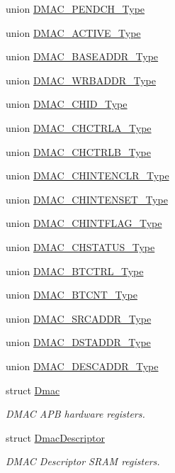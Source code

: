 \begin{DoxyCompactItemize}
union \mbox{\hyperlink{union_d_m_a_c___p_e_n_d_c_h___type}{D\+M\+A\+C\+\_\+\+P\+E\+N\+D\+C\+H\+\_\+\+Type}}
\item 
union \mbox{\hyperlink{union_d_m_a_c___a_c_t_i_v_e___type}{D\+M\+A\+C\+\_\+\+A\+C\+T\+I\+V\+E\+\_\+\+Type}}
\item 
union \mbox{\hyperlink{union_d_m_a_c___b_a_s_e_a_d_d_r___type}{D\+M\+A\+C\+\_\+\+B\+A\+S\+E\+A\+D\+D\+R\+\_\+\+Type}}
\item 
union \mbox{\hyperlink{union_d_m_a_c___w_r_b_a_d_d_r___type}{D\+M\+A\+C\+\_\+\+W\+R\+B\+A\+D\+D\+R\+\_\+\+Type}}
\item 
union \mbox{\hyperlink{union_d_m_a_c___c_h_i_d___type}{D\+M\+A\+C\+\_\+\+C\+H\+I\+D\+\_\+\+Type}}
\item 
union \mbox{\hyperlink{union_d_m_a_c___c_h_c_t_r_l_a___type}{D\+M\+A\+C\+\_\+\+C\+H\+C\+T\+R\+L\+A\+\_\+\+Type}}
\item 
union \mbox{\hyperlink{union_d_m_a_c___c_h_c_t_r_l_b___type}{D\+M\+A\+C\+\_\+\+C\+H\+C\+T\+R\+L\+B\+\_\+\+Type}}
\item 
union \mbox{\hyperlink{union_d_m_a_c___c_h_i_n_t_e_n_c_l_r___type}{D\+M\+A\+C\+\_\+\+C\+H\+I\+N\+T\+E\+N\+C\+L\+R\+\_\+\+Type}}
\item 
union \mbox{\hyperlink{union_d_m_a_c___c_h_i_n_t_e_n_s_e_t___type}{D\+M\+A\+C\+\_\+\+C\+H\+I\+N\+T\+E\+N\+S\+E\+T\+\_\+\+Type}}
\item 
union \mbox{\hyperlink{union_d_m_a_c___c_h_i_n_t_f_l_a_g___type}{D\+M\+A\+C\+\_\+\+C\+H\+I\+N\+T\+F\+L\+A\+G\+\_\+\+Type}}
\item 
union \mbox{\hyperlink{union_d_m_a_c___c_h_s_t_a_t_u_s___type}{D\+M\+A\+C\+\_\+\+C\+H\+S\+T\+A\+T\+U\+S\+\_\+\+Type}}
\item 
union \mbox{\hyperlink{union_d_m_a_c___b_t_c_t_r_l___type}{D\+M\+A\+C\+\_\+\+B\+T\+C\+T\+R\+L\+\_\+\+Type}}
\item 
union \mbox{\hyperlink{union_d_m_a_c___b_t_c_n_t___type}{D\+M\+A\+C\+\_\+\+B\+T\+C\+N\+T\+\_\+\+Type}}
\item 
union \mbox{\hyperlink{union_d_m_a_c___s_r_c_a_d_d_r___type}{D\+M\+A\+C\+\_\+\+S\+R\+C\+A\+D\+D\+R\+\_\+\+Type}}
\item 
union \mbox{\hyperlink{union_d_m_a_c___d_s_t_a_d_d_r___type}{D\+M\+A\+C\+\_\+\+D\+S\+T\+A\+D\+D\+R\+\_\+\+Type}}
\item 
union \mbox{\hyperlink{union_d_m_a_c___d_e_s_c_a_d_d_r___type}{D\+M\+A\+C\+\_\+\+D\+E\+S\+C\+A\+D\+D\+R\+\_\+\+Type}}
\item 
struct \mbox{\hyperlink{struct_dmac}{Dmac}}
\begin{DoxyCompactList}\small\item\em D\+M\+AC A\+PB hardware registers. \end{DoxyCompactList}\item 
struct \mbox{\hyperlink{struct_dmac_descriptor}{Dmac\+Descriptor}}
\begin{DoxyCompactList}\small\item\em D\+M\+AC Descriptor S\+R\+AM registers. \end{DoxyCompactList}\end{DoxyCompactItemize}

